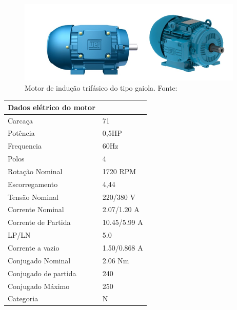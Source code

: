 \begin{figure}[H]
\centering
\includegraphics[scale=0.8]{figuras/motorgaiola.png}
\caption{Motor de indução trifásico do tipo gaiola. Fonte:\cite{WEG_catalogo}}
\label{fig:motorgaiola}
\end{figure}

\newpage
        \begin{table}[H]
            \begin{center}
              \begin{tabular}{|p{5cm}|p{5cm}|}
                \hline
                \textbf{Dados elétrico do motor} &
                \\ \hline
                Carcaça & 71
                \\ \hline
                Potência & 0,5HP
                \\ \hline
                Frequencia & 60Hz
                \\ \hline
                Polos & 4
                \\ \hline
                Rotação Nominal & 1720 RPM
                \\ \hline
                Escorregamento & 4,44
                \\ \hline
                Tensão Nominal & 220/380 V
                \\ \hline
                Corrente Nominal & 2.07/1.20 A
                \\ \hline
                Corrente de Partida & 10.45/5.99 A
                \\ \hline
                LP/LN & 5.0
                \\ \hline
                Corrente a vazio & 1.50/0.868 A
                \\ \hline
                Conjugado Nominal & 2.06 Nm
                \\ \hline
                Conjugado de partida & 240
                \\ \hline
                Conjugado Máximo & 250
                \\ \hline
                Categoria & N

\end{tabular}
\end{center}
\end{table}
